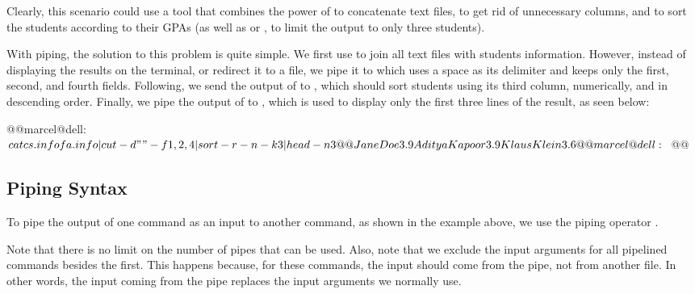 Clearly, this scenario could use a tool that combines the power of  to concatenate text files,  to get rid of unnecessary columns, and  to sort the students according to their GPAs (as well as  or , to limit the output to only three students).

With piping, the solution to this problem is quite simple. We first use  to join all text files with students information. However, instead of displaying the results on the terminal, or redirect it to a file, we pipe it to  which uses a space as its delimiter and keeps only the first, second, and fourth fields. Following, we send the output of  to , which should sort students using its third column, numerically, and in descending order. Finally, we pipe the output of  to , which is used to display only the first three lines of the result, as seen below:

\begin{command_line}[make]
@@marcel@dell:~$ cat cs.info fa.info | cut -d" " -f 1,2,4 | sort -r -n -k3 | head -n3 @@
Jane Doe 3.9
Aditya Kapoor 3.9
Klaus Klein 3.6
@@marcel@dell:~$ @@
\end{command_line}

\subsection{Piping Syntax}

To pipe the output of one command as an input to another command, as shown in the example above, we use the piping operator \mycommand{|}.


Note that there is no limit on the number of pipes that can be used. Also, note that we exclude the input arguments for all pipelined commands besides the first. This happens because, for these commands, the input should come from the pipe, not from another file. In other words, the input coming from the pipe replaces the input arguments we normally use.

